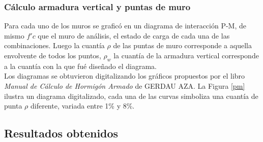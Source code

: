\subsubsection{Cálculo armadura vertical y puntas de muro}

Para cada uno de los muros se graficó en un diagrama de interacción P-M, de mismo $f'c$ que el muro de análisis, el estado de carga de cada una de las combinaciones. Luego la cuantía $\rho$ de las puntas de muro corresponde a aquella envolvente de todos los puntos, $\rho_w$ la cuantía de la armadura vertical corresponde a la cuantía con la que fué diseñado el diagrama. \\

Los diagramas se obtuvieron digitalizando los gráficos propuestos por el libro \textit{Manual de Cálculo de Hormigón Armado} de GERDAU AZA. La Figura \ref{pm} ilustra un diagrama digitalizado, cada una de las curvas simboliza una cuantía de punta $\rho$ diferente, variada entre 1\% y 8\%.


\subsection{Resultados obtenidos}

